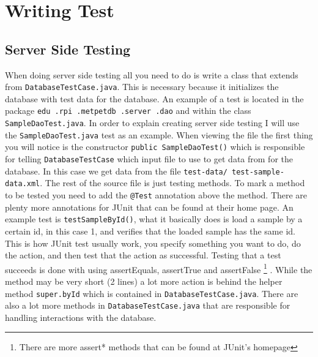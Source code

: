 \documentclass[10pt,letterpaper,onecolumn,oneside]{report}
\begin{document}
\section{Writing Test}
\subsection{Server Side Testing}
When doing server side testing all you need to do is write a class that extends
from \texttt{DatabaseTestCase.java}.  This is necessary because it initializes the database with test data for the database.  An example of a test is located in the
package \texttt{edu\ .rpi\ .metpetdb\ .server\ .dao} and within the class
\texttt{SampleDaoTest.java}.  In order to explain creating server side testing
I will use the \texttt{SampleDaoTest.java} test as an example.
When viewing the file the first thing you will notice is the constructor 
\texttt{public SampleDaoTest()} which is responsible for telling \texttt{DatabaseTestCase} 
which input file to use to get data from for the database.  In this case
we get data from the file \texttt{test-data/ test-sample-data.xml}.
The rest of the source file is just testing methods.  To mark a method to be tested
you need to add the \texttt{@Test} annotation above the method.  There are plenty
more annotations for JUnit that can be found at their home page.
An example test is \texttt{testSampleById()}, what it basically does is load a sample
by a certain id, in this case 1, and verifies that the loaded sample has the same id.  This is how JUnit test usually work, you specify something you want to do, do the action, and then test that the action as successful.  Testing that a test
succeeds is done with using assertEquals, assertTrue and assertFalse
\footnote{There are more assert* methods that can be found at JUnit's homepage}
. While the method may be very short (2 lines) a lot more action is behind
the helper method \texttt{super.byId} which is contained in \texttt{DatabaseTestCase.java}.
There are also a lot more methods in \texttt{DatabaseTestCase.java} that are
responsible for handling interactions with the database.
\end{document}
